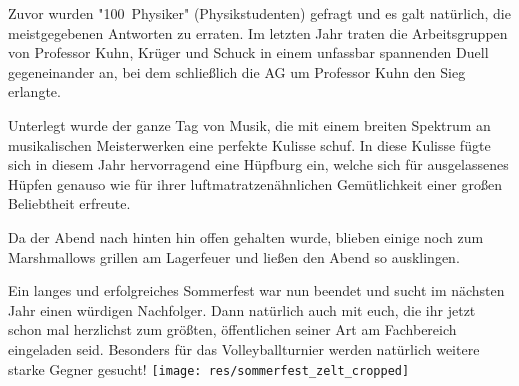 \begin{multicols*}{2}
Zuvor wurden "100~Physiker" (Physikstudenten) gefragt und es galt natürlich, die meistgegebenen Antworten zu erraten.
Im letzten Jahr traten die Arbeitsgruppen von Professor Kuhn, Krüger und Schuck in einem unfassbar spannenden Duell gegeneinander an, bei dem schließlich die AG um Professor Kuhn den Sieg erlangte.

Unterlegt wurde der ganze Tag von Musik, die mit einem breiten Spektrum an musikalischen Meisterwerken eine perfekte Kulisse schuf. In diese Kulisse fügte sich in diesem Jahr hervorragend eine Hüpfburg ein, welche sich für ausgelassenes Hüpfen genauso wie für ihrer luftmatratzenähnlichen Gemütlichkeit einer großen Beliebtheit erfreute.

Da der Abend nach hinten hin offen gehalten wurde, blieben einige noch zum Marshmallows grillen am Lagerfeuer und ließen
den Abend so ausklingen.

Ein langes und erfolgreiches Sommerfest war nun beendet und sucht im nächsten Jahr einen würdigen Nachfolger.
Dann natürlich auch mit euch, die ihr jetzt schon mal herzlichst zum größten, öffentlichen seiner Art am Fachbereich eingeladen seid.
Besonders für das Volleyballturnier werden natürlich weitere starke Gegner gesucht!
\texttt{[image: res/sommerfest\_zelt\_cropped]}
\end{multicols*}

